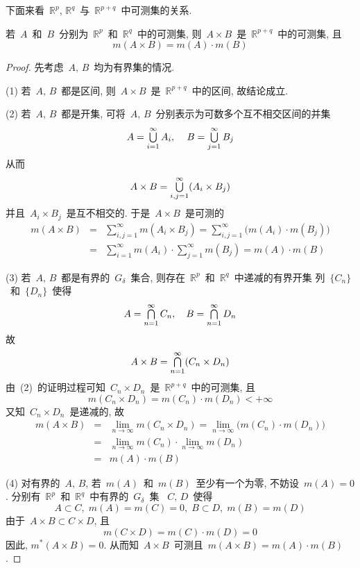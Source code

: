 下面来看~$\mathbb{R}^{p}$, $\mathbb{R}^{q}$~与~$\mathbb{R}^{p+q}$~中可测集的关系.

\begin{theorem} \label{thm-5-1}
若~$A$~和~$B$~分别为~$\mathbb{R}^{p}$~和~$\mathbb{R}^{q}$~中的可测集, 则~$A\times B$~是~$\mathbb{R}^{p+q}$~中的可测集, 且
\[
m(A\times B)=m(A)\cdot m(B)
\]
\end{theorem}

\begin{proof}
先考虑~$A,\,  B$~均为有界集的情况.

(1) 若~$A,\,  B$~都是区间, 则~$A\times B$~是~$\mathbb{R}^{p+q}$~中的区间, 故结论成立.

(2) 若~$A,\,  B$~都是开集, 可将~$A,\, B$~分别表示为可数多个互不相交区间的并集
\[
A=\mathop{\textstyle{\bigcup}}\limits_{i=1}^{\infty}A_{i},\, \quad B=\mathop{\textstyle{\bigcup}}\limits_{j=1}^{\infty}B_{j}
\]
从而
\[
A\times B= \mathop{\textstyle{\bigcup}}\limits_{i, j=1}^{\infty}(A_{i}\times B_{j})
\]
并且~$A_{i}\times B_{j}$~是互不相交的. 于是~$A \times B$~是可测的
\begin{eqnarray*}
m(A\times B)&=& \sum_{i,j=1}^{\infty}m(A_{i}\times B_{j})=\sum_{i,j=1}^{\infty}\big(m(A_{i})\cdot m(B_{j})\big)\\
&=& \sum_{i=1}^{\infty}m(A_{i})\cdot \sum_{j=1}^{\infty}m(B_{j})= m(A)\cdot m(B)
\end{eqnarray*}

(3) 若~$A,\, B$~都是有界的~$G_{\delta}$~集合, 则存在~$\mathbb{R}^{p}$~和~$\mathbb{R}^{q}$~中递减的有界开集
列~$\{C_{n}\}$~和~$\{D_{n}\}$~使得
\[
A=\mathop{\textstyle{\bigcap}}\limits_{n=1}^{\infty}C_{n}, \quad B=\mathop{\textstyle{\bigcap}}\limits_{n=1}^{\infty}D_{n}
\]
故
\[
A\times B= \mathop{\textstyle{\bigcap}}\limits_{n=1}^{\infty}(C_{n}\times D_{n})
\]
由~(2)~的证明过程可知~$C_{n}\times D_{n}$~是~$\mathbb{R}^{p+q}$~中的可测集, 且
\[
m(C_{n}\times D_{n})=m(C_{n}) \cdot m(D_{n})<+\infty
\]
又知~$C_{n}\times D_{n}$~是递减的, 故
\begin{eqnarray*}
m(A\times B)&=& \lim\limits_{n\rightarrow\infty}m(C_{n}\times D_{n})=\lim\limits_{n\rightarrow\infty}\big(m(C_{n})\cdot m(D_{n})\big) \\
&=& \lim\limits_{n\rightarrow\infty} m(C_{n})\cdot \lim\limits_{n\rightarrow\infty} m(D_{n})\\
&=& m(A)\cdot m(B)
\end{eqnarray*}


(4) 对有界的~$A,\,  B$, 若~$m(A)$~和~$m(B)$~至少有一个为零, 不妨设~$m(A)=0$. 分别有~$\mathbb{R}^{p}$~和~$\mathbb{R}^{q}$~中有界的~$G_{\delta}$~集~
$C, \, D$~使得
\[
A \subset C, \; m(A)=m(C)=0, \;  B \subset D, \;   m(B)=m(D)
\]
由于~$A \times B \subset C\times D$, 且
\[
m(C\times D)=m(C) \cdot m(D)=0
\]
因此, $m^{*}(A\times B)=0$. 从而知~$A\times B$~可测且~$m(A\times B)=m(A)\cdot m(B)$.


\end{proof}
